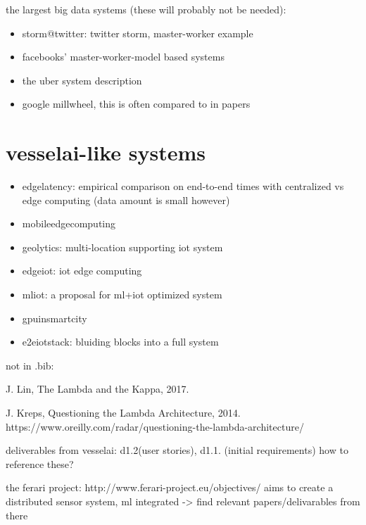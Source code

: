 \documentclass{article}
\begin{document}
the largest big data systems (these will probably not be needed):

\begin{itemize}
    \item \cite{storm@twitter} storm@twitter: twitter storm, master-worker example
    \item \cite{facebook} facebooks' master-worker-model based systems
    \item \cite{uber} the uber system description
    \item \cite{millwheel} google millwheel, this is often compared to in papers 
\end{itemize} 


\chapter{vesselai-like systems}

\begin{itemize}
    \item \cite{edgelatency} edgelatency: empirical comparison on end-to-end times with centralized vs edge computing (data amount is small however)
    \item \cite{mobileedgecomputing} mobileedgecomputing
    \item \cite{geolytics} geolytics: multi-location supporting iot system
    \item \cite{edgeiot} edgeiot: iot edge computing
    \item \cite{mliot} mliot: a proposal for ml+iot optimized system
    \item \cite{gpuinsmartcity} gpuinsmartcity
    \item \cite{e2eiotstack} e2eiotstack: bluiding blocks into a full system
\end{itemize}

not in .bib:

J. Lin, The Lambda and the Kappa, 2017.  

J. Kreps, Questioning the Lambda Architecture, 2014.  https://www.oreilly.com/radar/questioning-the-lambda-architecture/

deliverables from vesselai: d1.2(user stories), d1.1. (initial requirements) how to reference these?

the ferari project: http://www.ferari-project.eu/objectives/ aims to create a distributed sensor system, ml integrated
-> find relevant papers/delivarables from there

\printbibliography
\end{document}
